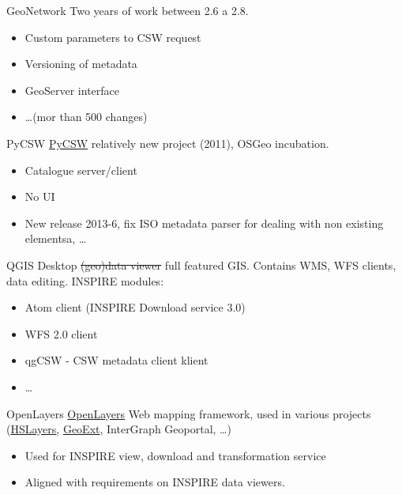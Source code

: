 \documentclass[xcolor=dvipsnames]{beamer}
\begin{document}
\begin{frame}{GeoNetwork}
Two years of work between 2.6 a 2.8.
    \begin{itemize}
        \item Custom parameters to CSW request
        \item Versioning of metadata
        \item GeoServer interface
        \item \dots (mor than 500 changes)
    \end{itemize}
\end{frame}

\begin{frame}{PyCSW}
    \href{http://pycsw.org}{PyCSW} relatively new project (2011), OSGeo
    incubation. 
    \begin{itemize}
        \item Catalogue server/client
        \item No UI
        \item New release 2013-6, fix ISO metadata parser for dealing with non
            existing elementsa, \dots
    \end{itemize}
\end{frame}

\begin{frame}{QGIS}
    Desktop \sout{(geo)data viewer} full featured GIS. Contains WMS, WFS
    clients, data editing.
    INSPIRE modules:
    \begin{itemize}
        \item Atom client (INSPIRE Download service 3.0)
        \item WFS 2.0 client
        \item qgCSW - CSW metadata client klient
        \item \dots
    \end{itemize}
\end{frame}

\begin{frame}{OpenLayers}
    \href{http://openlayers.org}{OpenLayers} Web mapping framework, used in
    various projects (\href{http://hslayers.org}{HSLayers},
    \href{http://geoext.org}{GeoExt}, InterGraph Geoportal, \dots)

    \begin{itemize}
        \item Used for INSPIRE view, download and transformation service
        \item Aligned with requirements on INSPIRE data viewers.
    \end{itemize}

\end{frame}
\end{document}
